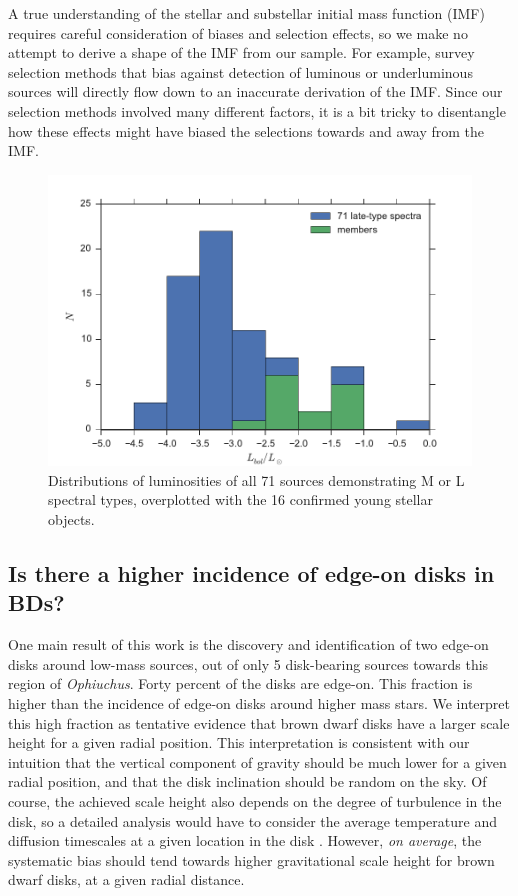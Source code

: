 A true understanding of the stellar and substellar initial mass function (IMF) requires careful consideration of biases and selection effects, so we make no attempt to derive a shape of the IMF from our sample.  For example, survey selection methods that bias against detection of luminous or underluminous sources will directly flow down to an inaccurate derivation of the IMF.  Since our selection methods involved many different factors, it is a bit tricky to disentangle how these effects might have biased the selections towards and away from the IMF.

\begin{figure}[ht!]
  \caption[Luminosity distibution of this sample and background contaminants]{Distributions of luminosities of all 71 sources demonstrating M or L spectral types, overplotted with the 16 confirmed young stellar objects. \label{fig_luminosity_dist} }
\centering
\includegraphics[scale=0.6]{chIMACS/figures/luminosity_histogram}
\end{figure}


\subsection{Is there a higher incidence of edge-on disks in BDs?}
One main result of this work is the discovery and identification of two edge-on disks around low-mass sources, out of only 5 disk-bearing sources towards this region of \emph{Ophiuchus}.  Forty percent of the disks are edge-on.  This fraction is higher than the incidence of edge-on disks around higher mass stars.  We interpret this high fraction as tentative evidence that brown dwarf disks have a larger scale height for a given radial position.  This interpretation is consistent with our intuition that the vertical component of gravity should be much lower for a given radial position, and that the disk inclination should be random on the sky.  Of course, the achieved scale height also depends on the degree of turbulence in the disk, so a detailed analysis would have to consider the average temperature and diffusion timescales at a given location in the disk \citep{2012A&A...539A...9M,2009MNRAS.394L.141E}.  However, \emph{on average}, the systematic bias should tend towards higher gravitational scale height for brown dwarf disks, at a given radial distance.

